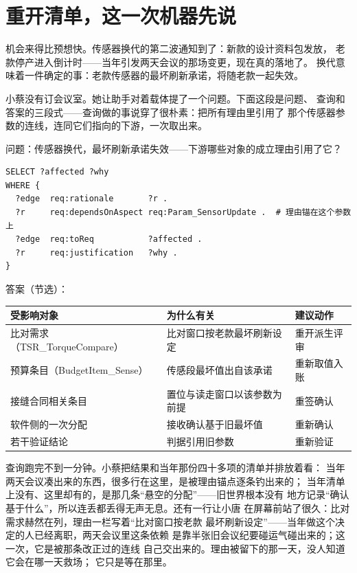 \section{重开清单，这一次机器先说}

机会来得比预想快。传感器换代的第二波通知到了：新款的设计资料包发放，
老款停产进入倒计时——当年引发两天会议的那场变更，现在真的落地了。
换代意味着一件确定的事：老款传感器的最坏刷新承诺，将随老款一起失效。

小蔡没有订会议室。她让助手对着载体提了一个问题。下面这段是问题、
查询和答案的三段式——查询做的事说穿了很朴素：把所有理由里引用了
那个传感器参数的连线，连同它们指向的下游，一次取出来。

问题：传感器换代，最坏刷新承诺失效——下游哪些对象的成立理由引用了它？

\nopagebreak[4]
\begin{codebox}
\begin{Verbatim}[fontsize=\small,breaklines=true,breakanywhere=true,breaksymbolleft={},breaksymbolright={}]
SELECT ?affected ?why
WHERE {
  ?edge  req:rationale       ?r .
  ?r     req:dependsOnAspect req:Param_SensorUpdate .  # 理由锚在这个参数上
  ?edge  req:toReq           ?affected .
  ?r     req:justification   ?why .
}
\end{Verbatim}
\end{codebox}

答案（节选）：

\begin{center}
\begingroup\small
\setlength{\tabcolsep}{4pt}
\begin{tabularx}{\linewidth}{@{}XXX@{}}
\toprule
受影响对象 & 为什么有关 & 建议动作 \\
\midrule
比对需求（TSR\_\allowbreak{}TorqueCompare） & 比对窗口按老款最坏刷新设定 & 重开派生评审 \\
预算条目（BudgetItem\_\allowbreak{}Sense） & 传感段最坏值出自该承诺 & 重新取值入账 \\
接缝合同相关条目 & 置位与读走窗口以该参数为前提 & 重签确认 \\
软件侧的一次分配 & 接收确认基于旧最坏值 & 重新确认 \\
若干验证结论 & 判据引用旧参数 & 重新验证 \\
\bottomrule
\end{tabularx}
\endgroup
\end{center}

查询跑完不到一分钟。小蔡把结果和当年那份四十多项的清单并排放着看：
当年两天会议凑出来的东西，很多行在这里，是被理由锚点逐条钓出来的；
当年清单上没有、这里却有的，是那几条“悬空的分配”——旧世界根本没有
地方记录“确认基于什么”，所以连丢都丢得无声无息。还有一行让小唐
在屏幕前站了很久：比对需求赫然在列，理由一栏写着“比对窗口按老款
最坏刷新设定”——当年做这个决定的人已经离职，两天会议里这条依赖
是靠半张旧会议纪要碰运气碰出来的；这一次，它是被那条改正过的连线
自己交出来的。理由被留下的那一天，没人知道它会在哪一天救场；
它只是等在那里。

